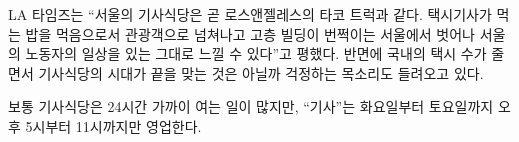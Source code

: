 \documentclass{translation}
\begin{document}
LA 타임즈는 ``서울의 기사식당은 곧 로스앤젤레스의 타코 트럭과 같다. 택시기사가 먹는 밥을 먹음으로서 관광객으로 넘쳐나고 고층 빌딩이 번쩍이는 서울에서 벗어나 서울의 노동자의 일상을 있는 그대로 느낄 수 있다''고 평했다.
반면에 국내의 택시 수가 줄면서 기사식당의 시대가 끝을 맞는 것은 아닐까 걱정하는 목소리도 들려오고 있다.
%

보통 기사식당은 24시간 가까이 여는 일이 많지만, ``기사''는 화요일부터 토요일까지 오후 5시부터 11시까지만 영업한다.
\end{document}
